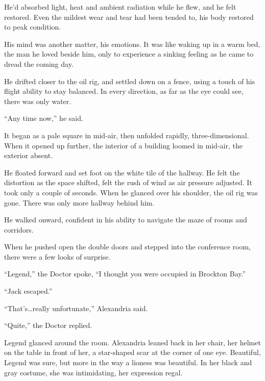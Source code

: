 He'd absorbed light, heat and ambient radiation while he flew, and he felt restored.  Even the mildest wear and tear had been tended to, his body restored to peak condition.



His mind was another matter, his emotions.  It was like waking up in a warm bed, the man he loved beside him, only to experience a sinking feeling as he came to dread the coming day.



He drifted closer to the oil rig, and settled down on a fence, using a touch of his flight ability to stay balanced.  In every direction, as far as the eye could see, there was only water.



``Any time now,'' he said.



It began as a pale square in mid-air, then unfolded rapidly, three-dimensional.  When it opened up further, the interior of a building loomed in mid-air, the exterior absent.



He floated forward and set foot on the white tile of the hallway.  He felt the distortion as the space shifted, felt the rush of wind as air pressure adjusted.  It took only a couple of seconds.  When he glanced over his shoulder, the oil rig was gone.  There was only more hallway behind him.



He walked onward, confident in his ability to navigate the maze of rooms and corridors.



When he pushed open the double doors and stepped into the conference room, there were a few looks of surprise.



``Legend,'' the Doctor spoke, ``I thought you were occupied in Brockton Bay.''



``Jack escaped.''



``That's\ldots really unfortunate,'' Alexandria said.



``Quite,'' the Doctor replied.



Legend glanced around the room.  Alexandria leaned back in her chair, her helmet on the table in front of her, a star-shaped scar at the corner of one eye.  Beautiful, Legend was sure, but more in the way a lioness was beautiful.  In her black and gray costume, she was intimidating, her expression regal.



